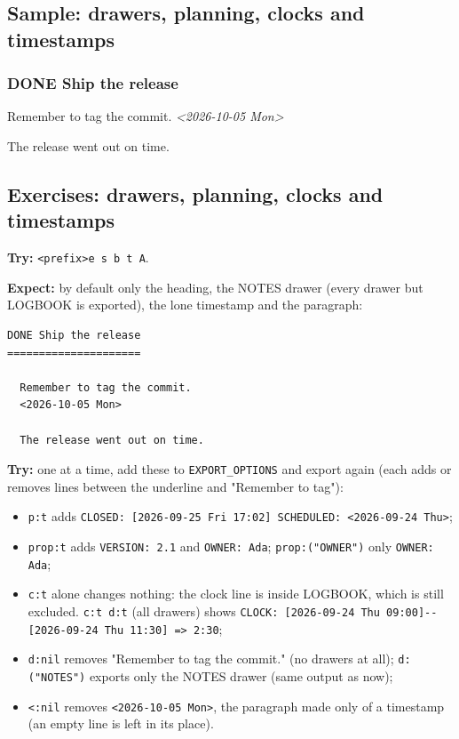 \subsection{Sample: drawers, planning, clocks and timestamps}
\label{sec:orgff4c1b8}
\subsubsection{{\bfseries\sffamily DONE} Ship the release}
\label{sec:org1040116}
Remember to tag the commit.
\textit{<2026-10-05 Mon>}

The release went out on time.
\subsection{Exercises: drawers, planning, clocks and timestamps}
\label{sec:orgab33211}
\textbf{Try:} \texttt{<prefix>e s b t A}.

\textbf{Expect:} by default only the heading, the NOTES drawer (every drawer but
LOGBOOK is exported), the lone timestamp and the paragraph:

\begin{verbatim}
DONE Ship the release
=====================

  Remember to tag the commit.
  <2026-10-05 Mon>

  The release went out on time.
\end{verbatim}

\textbf{Try:} one at a time, add these to \texttt{EXPORT\_OPTIONS} and export again
(each adds or removes lines between the underline and "Remember to tag"):
\begin{itemize}
\item \texttt{p:t} adds \texttt{CLOSED: [2026-09-25 Fri 17:02]  SCHEDULED: <2026-09-24 Thu>};
\item \texttt{prop:t} adds \texttt{VERSION: 2.1} and \texttt{OWNER: Ada}; \texttt{prop:("OWNER")} only
\texttt{OWNER: Ada};
\item \texttt{c:t} alone changes nothing: the clock line is inside LOGBOOK, which is
still excluded. \texttt{c:t d:t} (all drawers) shows
\texttt{CLOCK: [2026-09-24 Thu 09:00]-{}-{}[2026-09-24 Thu 11:30]  =>  2:30};
\item \texttt{d:nil} removes "Remember to tag the commit." (no drawers at all);
\texttt{d:("NOTES")} exports only the NOTES drawer (same output as now);
\item \texttt{<:nil} removes \texttt{<2026-10-05 Mon>}, the paragraph made only of a
timestamp (an empty line is left in its place).
\end{itemize}
